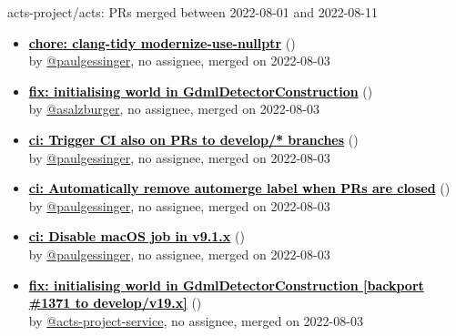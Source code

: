 \begin{frame}[allowframebreaks]{ acts-project/acts: PRs merged 
between 2022-08-01 and 2022-08-11
}
\begin{itemize}
    \item\prmerged\textbf{\href{https://github.com/acts-project/acts/pull/1358}{\textcolor{black}{chore: clang-tidy modernize-use-nullptr}}}
    (\href{https://github.com/acts-project/acts/pull/1358}{}) \\
    by \href{https://github.com/paulgessinger}{@paulgessinger}, {}no assignee, merged on 2022-08-03

    \item\prmerged\textbf{\href{https://github.com/acts-project/acts/pull/1371}{\textcolor{black}{fix: initialising world in GdmlDetectorConstruction}}}
    (\href{https://github.com/acts-project/acts/pull/1371}{}) \\
    by \href{https://github.com/asalzburger}{@asalzburger}, {}no assignee, merged on 2022-08-03

    \item\prmerged\textbf{\href{https://github.com/acts-project/acts/pull/1367}{\textcolor{black}{ci: Trigger CI also on PRs to develop/* branches}}}
    (\href{https://github.com/acts-project/acts/pull/1367}{}) \\
    by \href{https://github.com/paulgessinger}{@paulgessinger}, {}no assignee, merged on 2022-08-03

    \item\prmerged\textbf{\href{https://github.com/acts-project/acts/pull/1372}{\textcolor{black}{ci: Automatically remove automerge label when PRs are closed}}}
    (\href{https://github.com/acts-project/acts/pull/1372}{}) \\
    by \href{https://github.com/paulgessinger}{@paulgessinger}, {}no assignee, merged on 2022-08-03

    \item\prmerged\textbf{\href{https://github.com/acts-project/acts/pull/1374}{\textcolor{black}{ci: Disable macOS job in v9.1.x}}}
    (\href{https://github.com/acts-project/acts/pull/1374}{}) \\
    by \href{https://github.com/paulgessinger}{@paulgessinger}, {}no assignee, merged on 2022-08-03

    \item\prmerged\textbf{\href{https://github.com/acts-project/acts/pull/1375}{\textcolor{black}{fix: initialising world in GdmlDetectorConstruction [backport \#1371 to develop/v19.x]}}}
    (\href{https://github.com/acts-project/acts/pull/1375}{}) \\
    by \href{https://github.com/acts-project-service}{@acts-project-service}, {}no assignee, merged on 2022-08-03


\end{itemize}
\end{frame}

